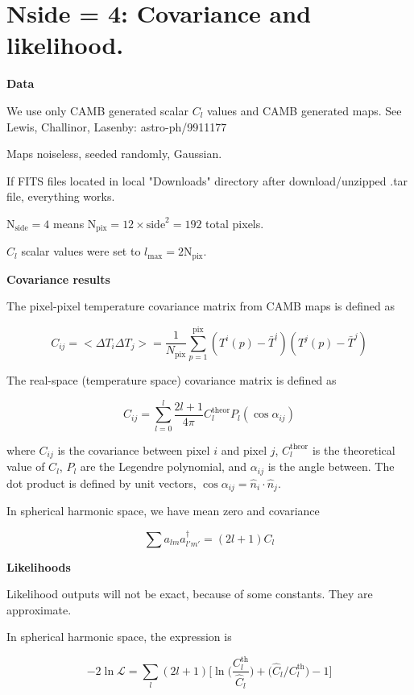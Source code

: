 \documentclass[a4paper, 11pt]{article}
\begin{document}
\section*{Nside = 4: Covariance and likelihood. }

\textbf{Data}

We use only CAMB generated scalar $C_l$ values and CAMB generated maps. See Lewis, Challinor, Lasenby: astro-ph/9911177

Maps noiseless, seeded randomly, Gaussian.

If FITS files located in local "Downloads" directory after download/unzipped .tar file, everything works. 

$\text{N}_\text{side}=4$ means $\text{N}_\text{pix}=12\times\text{side}^2=192$ total pixels. 

$C_l$ scalar values were set to $l_\text{max}=2\text{N}_\text{pix}$.


\textbf{Covariance results}

The pixel-pixel temperature covariance matrix from CAMB maps is defined as

$$
C_{ij} = <\Delta T_i \Delta T_j > = \frac{1}{N_{\text{pix}}} \sum^{\text{pix}}_{p=1} (T^i(p)-\bar{T}^i) (T^j(p)-\bar{T}^j)
$$



The real-space (temperature space) covariance matrix is defined as 

$$
C_{ij}=\sum^{l}_{l=0} \frac{2l+1}{4\pi} C^{\text{theor}}_{l}P_{l}(\cos\alpha_{ij})
$$

where $C_{ij}$ is the covariance between pixel $i$ and pixel $j$,  $C^{\text{theor}}_{l}$ is the theoretical value of $C_l$, $P_{l}$  are the Legendre polynomial, and $\alpha_{ij}$ is the angle between. The dot product is defined by unit vectors, $\cos\alpha_{ij}=\hat{n}_{i}\cdot\hat{n}_{j}$.

In spherical harmonic space, we have mean zero and covariance 

\begin{equation}
\sum a_{lm} a^{\dagger}_{l'm'} = (2l+1)C_l
\end{equation}

\textbf{Likelihoods}

Likelihood outputs will not be exact, because of some constants. They are approximate. 

In spherical harmonic space, the expression is 

\begin{equation}
-2\ln\mathcal{L} = \sum_{l}(2l+1)\Big[\ln\Big( \frac{C^{\text{th}}_l}{\hat{C}_l}\Big) +\Big(\hat{C}_l/C^{\text{th}}_l\Big)-1 \Big]
\end{equation}
\end{document}

